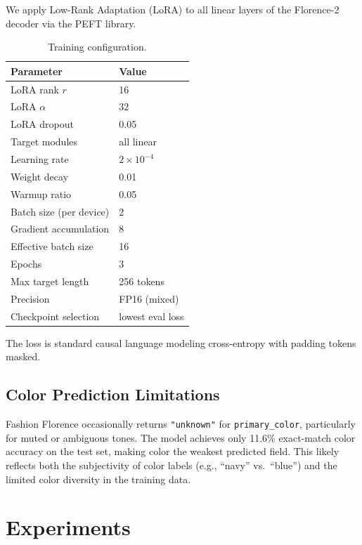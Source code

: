 \documentclass[10pt,twocolumn]{article}
\begin{document}
We apply Low-Rank Adaptation (LoRA) \citep{hu2022lora} to all linear layers
of the Florence-2 decoder via the PEFT library.

\begin{table}[t]
\centering
\caption{Training configuration.}
\label{tab:hyperparams}
\begin{tabular}{ll}
\toprule
Parameter & Value \\
\midrule
LoRA rank $r$ & 16 \\
LoRA $\alpha$ & 32 \\
LoRA dropout & 0.05 \\
Target modules & all linear \\
Learning rate & $2 \times 10^{-4}$ \\
Weight decay & 0.01 \\
Warmup ratio & 0.05 \\
Batch size (per device) & 2 \\
Gradient accumulation & 8 \\
Effective batch size & 16 \\
Epochs & 3 \\
Max target length & 256 tokens \\
Precision & FP16 (mixed) \\
Checkpoint selection & lowest eval loss \\
\bottomrule
\end{tabular}
\end{table}

The loss is standard causal language modeling cross-entropy with padding
tokens masked.

\subsection{Color Prediction Limitations}

Fashion Florence occasionally returns \texttt{"unknown"} for
\texttt{primary\_color}, particularly for muted or ambiguous tones.
The model achieves only 11.6\% exact-match color accuracy on the test set,
making color the weakest predicted field.  This likely reflects both the
subjectivity of color labels (e.g., ``navy'' vs.\ ``blue'') and the
limited color diversity in the training data.

\section{Experiments}
\label{sec:experiments}
\end{document}
